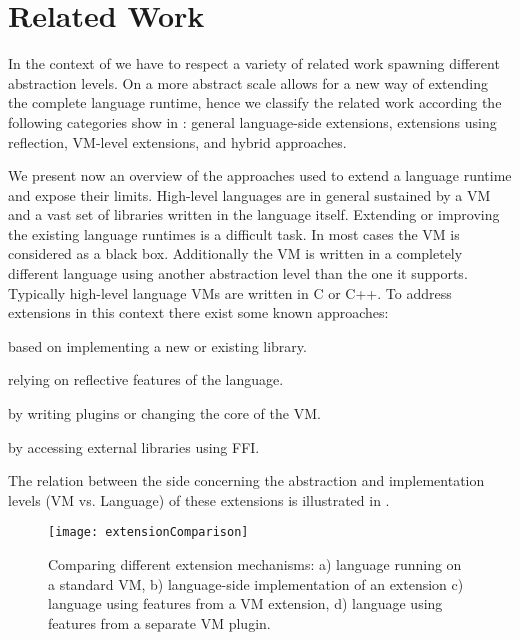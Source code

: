 \section{Related Work}

In the context of \B we have to respect a variety of related work spawning different abstraction levels.
On a more abstract scale \B allows for a new way of extending the complete language runtime, hence we classify the related work according the following categories show in : general language-side extensions, extensions using reflection, VM-level extensions, and hybrid approaches.

We present now an overview of the approaches used to extend a language runtime and expose their limits.
High-level languages are in general sustained by a VM and a vast set of libraries written in the language itself. 
Extending or improving the existing language runtimes is a difficult task.
In most cases the VM is considered as a black box.
Additionally the VM is written in a completely different language using another abstraction level than the one it supports.
Typically high-level language VMs are written in C or C++.
To address extensions in this context there exist some known approaches:

\begin{description}[noitemsep]
	\item[Language-side Library] based on implementing a new or existing library. 
	\item[Language-side Reflective Extension] relying on reflective features of the language. 
	\item[VM Extension] by writing plugins or changing the core of the VM.
	\item[Hybrid Extension] by accessing external libraries using FFI.  
\end{description}
%

The relation between the side concerning the abstraction and implementation levels (VM vs. Language) of these extensions is illustrated in .

\begin{figure}[h]
	\texttt{[image: extensionComparison]}
	\caption[Language Extension Mechanisms]{Comparing different extension mechanisms: 
		a) language running on a standard VM, 
		b) language-side implementation of an extension
		c) language using features from a VM extension, 
		d) language using features from a separate VM plugin.}
\end{figure}

